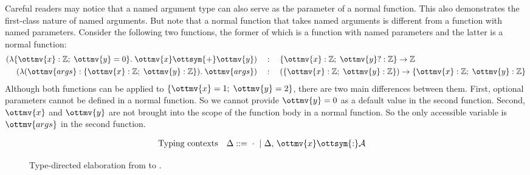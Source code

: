 Careful readers may notice that a named argument type can also serve as the
parameter of a normal function. This also demonstrates the first-class nature of
named arguments. But note that a normal function that takes named
arguments is different from a function with named parameters. Consider the
following two functions, the former of which is a function with named parameters
and the latter is a normal function:
\begin{align*}
                    (\lambda\{\ottmv{x}: \mathbb{Z} ;\;\ottmv{y}=0\}.\;\ottmv{x}  \ottsym{+}  \ottmv{y}) \quad&:\quad \{\ottmv{x}: \mathbb{Z} ;\;\ottmv{y}?: \mathbb{Z} \} \rightarrow  \mathbb{Z}  \\
  (\lambda(\ottmv{args}:\{\ottmv{x}: \mathbb{Z} ;\;\ottmv{y}: \mathbb{Z} \}).\;\ottmv{args}) \quad&:\quad (\{\ottmv{x}: \mathbb{Z} ;\;\ottmv{y}: \mathbb{Z} \}) \rightarrow \{\ottmv{x}: \mathbb{Z} ;\;\ottmv{y}: \mathbb{Z} \}
\end{align*}
Although both functions can be applied to $\{\ottmv{x}=1;\;\ottmv{y}=2\}$, there are two
main differences between them. First, optional parameters cannot be defined in a
normal function. So we cannot provide $\ottmv{y}=0$ as a default value in the second
function. Second, $\ottmv{x}$ and $\ottmv{y}$ are not brought into the scope of the
function body in a normal function. So the only accessible variable is $\ottmv{args}$
in the second function.

\renewcommand{\IUdrulePElaXXOptional}[1]{\ottdrule[#1]{%
\ottpremise{ \Delta \,\vdash\, _{\!\!\!\! \ottmv{x} }\:\: \rho \ottsym{:} \mathcal{P} \,\rightsquigarrow\, \ottnt{letin} \,\dashv\, \Delta' }%
\ottpremise{\Delta'  \,\vdash\,  \epsilon  \ottsym{:}  \mathcal{A}  \,\rightsquigarrow\,  \ottnt{e}}%
}{
\Delta\,\vdash_{\!\ottmv{x}}\,\ottsym{(}  \rho  ;\,  \ell  \ottsym{=}  \epsilon  \ottsym{)}:\ottsym{(}  \mathcal{P}  ;\,  \ell  \ottsym{\mbox{?}}  \ottsym{:}  \mathcal{A}  \ottsym{)}\\
 \,\rightsquigarrow\,  \ottnt{letin} \circ \ottkw{let} \, \ell  \ottsym{=}  \ottkw{switch} \, \ottmv{x}  \ottsym{.}  \ell \, \ottkw{as} \, \ottmv{y} \, \ottkw{case} \, |  \mathcal{A}  |  \Rightarrow  \ottmv{y} \, \ottkw{case} \, \ottkw{Null}  \Rightarrow  \ottnt{e} \, \ottkw{in}  \,\dashv\, \Delta'  ,\,  \ell  \ottsym{:}  \mathcal{A}}{%
{\ottdrulename{PEla\_Optional}}{}%
}}

\begin{figure}
\begin{align*}
  &\text{Typing contexts}&\Delta ::=&~  \cdot  ~|~ \Delta  ,\,  \ottmv{x}  \ottsym{:}  \mathcal{A}
\end{align*}
\IUdefnelab{}
\IUdefnpelab{}
\caption{Type-directed elaboration from \uaena to \lambdaiu.} \label{fig:elab}
\end{figure}

